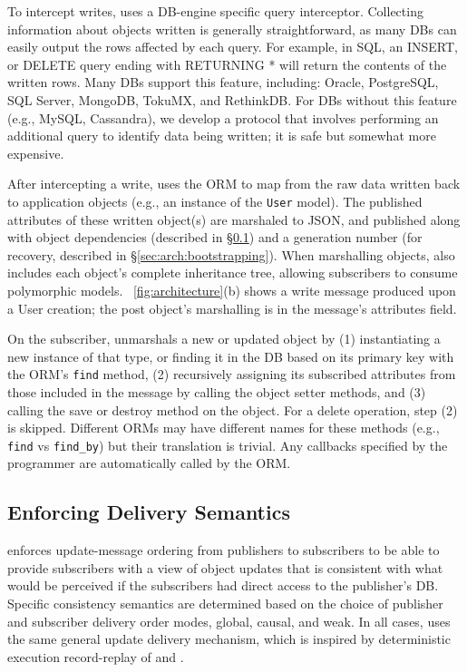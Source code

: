To intercept writes, \synapse uses a DB-engine specific query interceptor.
Collecting information about objects written is
generally straightforward, as many DBs can easily output the rows affected
by each query. For example, in SQL, an {\code INSERT}, or {\code DELETE}
query ending with {\code RETURNING *} will return the contents of the
written rows. Many DBs support this feature, including: Oracle, PostgreSQL, SQL
Server, MongoDB, TokuMX, and RethinkDB. For DBs without this feature
(e.g., MySQL, Cassandra), we develop a protocol that involves performing an additional
query to identify data being written; it is safe but somewhat more expensive.


After intercepting a write, \synapse uses the ORM to map from the raw data
written back to application objects (e.g., an instance of the {\tt User} model).
The published attributes of these written object(s) are marshaled to JSON, and published
along with object dependencies (described in
\S\ref{sec:arch:cross-db-causality}) and a generation number (for recovery,
described in \S\ref{sec:arch:bootstrapping}). When marshalling objects,
\synapse also includes each object's complete inheritance tree, allowing
subscribers to consume polymorphic models.
\F~\ref{fig:architecture}(b) shows a write message produced
upon a {\code User} creation; the post object's marshalling is in the message's
{\code attributes} field.

On the subscriber, \synapse unmarshals a new or updated object by (1)
instantiating a new instance of that type, or finding it in the DB based on its primary key with
the ORM's {\tt find} method, (2) recursively assigning its
subscribed attributes from those included in the message by calling the
object setter methods, and (3) calling the {\code save} or {\code
destroy} method on the object. For a delete operation, step (2) is skipped.
Different ORMs may have different names for these methods (e.g., {\tt find} vs
{\tt find\_by}) but their translation is trivial. Any callbacks specified by the
programmer are automatically called by the ORM.

\subsection{Enforcing Delivery Semantics} \label{sec:arch:cross-db-causality}

\synapse enforces update-message ordering from publishers to
subscribers to be able to provide subscribers with a view of object updates that 
is consistent with what would be perceived if the subscribers had
direct access to the publisher's DB.  Specific consistency
semantics are determined based on the choice of publisher and
subscriber delivery order modes, global, causal, and weak.  In all
cases, \synapse uses the same general update delivery mechanism,
which is inspired by deterministic execution record-replay of \scribe and \dora.

